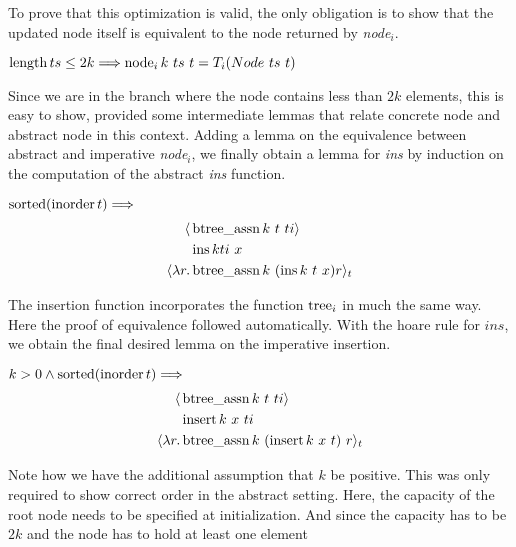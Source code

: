 To prove that this optimization is valid, the only obligation
is to show that the updated node itself is equivalent
to the node returned by \textit{node$_i$}.

\begin{lemma}$\operatorname{length} ts \leq 2k \Longrightarrow
    \operatorname{node}_i k\ ts\ t = T_i (Node\ ts\ t)$
\end{lemma}

Since we are in the branch where the node contains less than $2k$
elements, this is easy to show, provided some intermediate lemmas
that relate concrete node and abstract node in this context.
Adding a lemma on the equivalence between abstract and imperative
\textit{node$_i$}, we finally obtain a lemma for \textit{ins}
by induction on the computation
of the abstract \textit{ins} function.

\begin{lemma} $\operatorname{sorted} (\operatorname{inorder} t) \Longrightarrow$ \\
    \begin{align*}
       \langle &\operatorname{btree\_assn} k\ t\ ti\rangle \\
               &\operatorname{ins} k ti\ x \\
       \langle \lambda r. &\operatorname{btree\_assn} k\ (\operatorname{ins} k\ t\ x) r\rangle_t
    \end{align*}
\end{lemma}

The insertion function incorporates the function $\operatorname{tree}_i$
in much the same way.
Here the proof of equivalence followed automatically.
With the hoare rule for $ins$, we obtain the final desired lemma
on the imperative insertion.

\begin{lemma} $k > 0 \wedge \operatorname{sorted} (\operatorname{inorder} t) \Longrightarrow$ \\
\begin{align*}
   \langle &\btreeassn k\ t\ ti\rangle \\
           &\insertfun k\ x\ ti \\
   \langle \lambda r. &\btreeassn k\ (\insertfun k\ x\ t)\ r\rangle_t
\end{align*}
\end{lemma}

Note how we have the additional assumption that $k$ be positive.
This was only required to show correct order in the abstract setting.
Here, the capacity of the root node needs to be specified at initialization.
And since the capacity has to be $2k$ and the node has to hold at least one element


